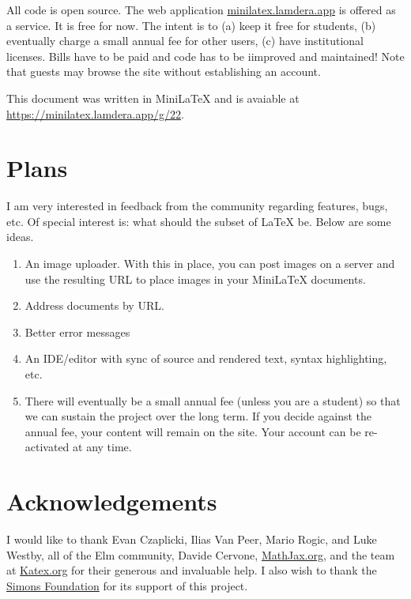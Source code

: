 All code is open source. The web application \href{https://minilatex.lamdera.app}{minilatex.lamdera.app}  is offered as a service. It is free for now. The intent is to (a) keep it free for students, (b) eventually charge a small annual fee for other users, (c) have institutional licenses. Bills have to be paid and code has to be iimproved and maintained!  Note that guests may browse the site without establishing an account.



This document was written in MiniLaTeX and is avaiable at \href{https://minilatex.lamdera.app/g/22}{https://minilatex.lamdera.app/g/22}.


\section{Plans}

I am very interested in feedback from the community regarding features, bugs, etc.  Of special interest is: what should the subset of LaTeX be.  Below are some ideas.

\begin{enumerate}

\item An image uploader.  With this in place, you can post images on a server and use the resulting URL to place images in your MiniLaTeX documents.

\item Address documents by URL.

\item Better error messages

\item An IDE/editor with sync of source and rendered text, syntax highlighting, etc.

\item  There will eventually be a small annual fee (unless you are a student) so that we can sustain the project over the long term.  If you decide against the annual fee, your content will remain on the site.  Your account can be re-activated at any time.

\end{enumerate}


\section{Acknowledgements}

I would like to thank Evan Czaplicki, Ilias Van Peer, Mario Rogic, and Luke Westby, all of the Elm community, Davide Cervone, \href{https://mathjax.org}{MathJax.org}, and the team at \href{https://katex.org}{Katex.org} for their generous and invaluable help.   I also wish to thank the \href{https://simonsfoundation.org}{Simons Foundation} for its support of this project.
